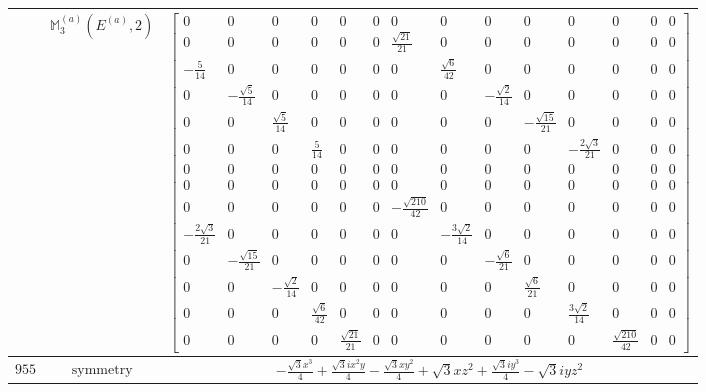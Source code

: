 \documentclass[fleqn,8pt,landscape]{jsarticle}
\begin{document}
\begin{longtable}{ccc}
$  $ & $ \mathbb{M}_{3}^{(a)}(E^{(a)},2) $ & $ \begin{bmatrix} 0 & 0 & 0 & 0 & 0 & 0 & 0 & 0 & 0 & 0 & 0 & 0 & 0 & 0 \\ 0 & 0 & 0 & 0 & 0 & 0 & \frac{\sqrt{21}}{21} & 0 & 0 & 0 & 0 & 0 & 0 & 0 \\ - \frac{5}{14} & 0 & 0 & 0 & 0 & 0 & 0 & \frac{\sqrt{6}}{42} & 0 & 0 & 0 & 0 & 0 & 0 \\ 0 & - \frac{\sqrt{5}}{14} & 0 & 0 & 0 & 0 & 0 & 0 & - \frac{\sqrt{2}}{14} & 0 & 0 & 0 & 0 & 0 \\ 0 & 0 & \frac{\sqrt{5}}{14} & 0 & 0 & 0 & 0 & 0 & 0 & - \frac{\sqrt{15}}{21} & 0 & 0 & 0 & 0 \\ 0 & 0 & 0 & \frac{5}{14} & 0 & 0 & 0 & 0 & 0 & 0 & - \frac{2 \sqrt{3}}{21} & 0 & 0 & 0 \\ 0 & 0 & 0 & 0 & 0 & 0 & 0 & 0 & 0 & 0 & 0 & 0 & 0 & 0 \\ 0 & 0 & 0 & 0 & 0 & 0 & 0 & 0 & 0 & 0 & 0 & 0 & 0 & 0 \\ 0 & 0 & 0 & 0 & 0 & 0 & - \frac{\sqrt{210}}{42} & 0 & 0 & 0 & 0 & 0 & 0 & 0 \\ - \frac{2 \sqrt{3}}{21} & 0 & 0 & 0 & 0 & 0 & 0 & - \frac{3 \sqrt{2}}{14} & 0 & 0 & 0 & 0 & 0 & 0 \\ 0 & - \frac{\sqrt{15}}{21} & 0 & 0 & 0 & 0 & 0 & 0 & - \frac{\sqrt{6}}{21} & 0 & 0 & 0 & 0 & 0 \\ 0 & 0 & - \frac{\sqrt{2}}{14} & 0 & 0 & 0 & 0 & 0 & 0 & \frac{\sqrt{6}}{21} & 0 & 0 & 0 & 0 \\ 0 & 0 & 0 & \frac{\sqrt{6}}{42} & 0 & 0 & 0 & 0 & 0 & 0 & \frac{3 \sqrt{2}}{14} & 0 & 0 & 0 \\ 0 & 0 & 0 & 0 & \frac{\sqrt{21}}{21} & 0 & 0 & 0 & 0 & 0 & 0 & \frac{\sqrt{210}}{42} & 0 & 0 \end{bmatrix} $ \\ \hline
$ 955 $ & $ \text{symmetry} $ & $ - \frac{\sqrt{3} x^{3}}{4} + \frac{\sqrt{3} i x^{2} y}{4} - \frac{\sqrt{3} x y^{2}}{4} + \sqrt{3} x z^{2} + \frac{\sqrt{3} i y^{3}}{4} - \sqrt{3} i y z^{2} $ \\

\end{longtable}
\end{document}
